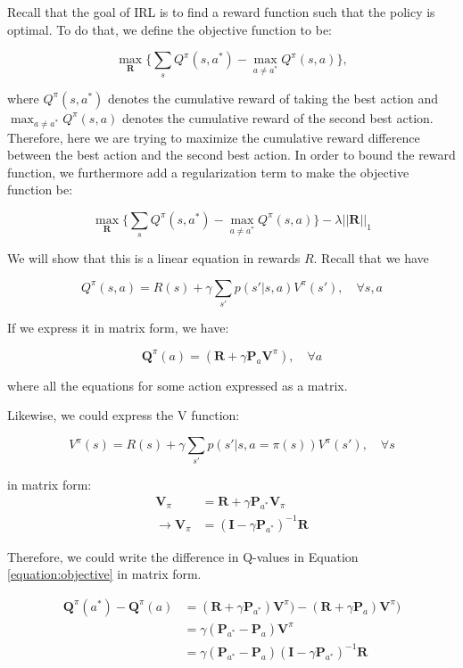 \documentclass[11pt]{article}
\begin{document}
Recall that the goal of IRL is to find a reward function such that the policy is optimal. To do that, we define the objective function to be:

$$\max_{\mathbf{R}} \{ \sum_s Q^\pi(s,a^*) - \max_{a \neq a^*} Q^\pi(s,a) \},$$

where $Q^\pi(s,a^*)$ denotes the cumulative reward of taking the best action and $\max_{a \neq a^*} Q^\pi(s,a)$ denotes the cumulative reward of the second best action. Therefore, here we are trying to maximize the cumulative reward difference between the best action and the second best action. In order to bound the reward function, we furthermore add a regularization term to make the objective function be:

\begin{equation}
\max_{\mathbf{R}} \{ \sum_s Q^\pi(s,a^*) - \max_{a \neq a^*} Q^\pi(s,a) \} - \lambda ||\mathbf{R}||_1
\label{equation:objective}
\end{equation}

We will show that this is a linear equation in rewards $R$. Recall that we have

$$Q^\pi(s,a) = R(s) + \gamma \sum_{s'} p(s'|s,a)V^\pi(s'), \quad \forall{s,a}$$


If we express it in matrix form, we have:

$$\mathbf{Q}^\pi(a) = (\mathbf{R}+\gamma\mathbf{P}_a\mathbf{V}^\pi), \quad \forall{a}$$

where all the equations for some action expressed as a matrix.

Likewise, we could express the V function:

$$V^\pi(s) = R(s) + \gamma \sum_{s'} p(s'|s, a = \pi(s))V^\pi(s'), \quad \forall{s}$$

in matrix form:
\begin{equation}
\begin{split}
\mathbf{V}_\pi & = \mathbf{R} + \gamma \mathbf{P}_{a^*}\mathbf{V}_\pi\\
\rightarrow \mathbf{V}_\pi & = (\mathbf{I}-\gamma \mathbf{P}_{a^*})^{-1}\mathbf{R}
\end{split}
\label{equ: vpi}
\end{equation}

Therefore, we could write the difference in Q-values in Equation \ref{equation:objective} in matrix form.

\begin{equation}
\begin{split}
\mathbf{Q}^\pi(a^*) - \mathbf{Q}^\pi(a) & =(\mathbf{R} + \gamma \mathbf{P}_{a^*}) \mathbf{V}^\pi ) - (\mathbf{R} + \gamma \mathbf{P}_{a}) \mathbf{V}^\pi) \\
& = \gamma(\mathbf{P}_{a^*} - \mathbf{P}_{a}) \mathbf{V}^\pi \\
& = \gamma(\mathbf{P}_{a^*} - \mathbf{P}_{a}) (\mathbf{I} - \gamma\mathbf{P}_{a^*})^{-1} \mathbf{R}
\end{split}
\end{equation}
\end{document}

